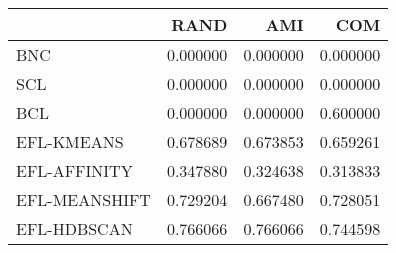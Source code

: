\begin{tabular}{lrrr}
\toprule
 & RAND & AMI & COM \\
\midrule
BNC & 0.000000 & 0.000000 & 0.000000 \\
SCL & 0.000000 & 0.000000 & 0.000000 \\
BCL & 0.000000 & 0.000000 & 0.600000 \\
EFL-KMEANS & 0.678689 & 0.673853 & 0.659261 \\
EFL-AFFINITY & 0.347880 & 0.324638 & 0.313833 \\
EFL-MEANSHIFT & 0.729204 & 0.667480 & 0.728051 \\
EFL-HDBSCAN & 0.766066 & 0.766066 & 0.744598 \\
\bottomrule
\end{tabular}
